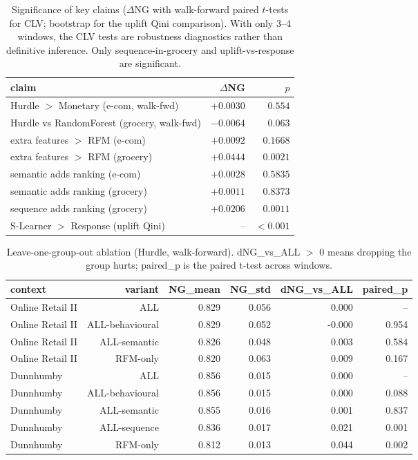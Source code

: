 \begin{table}[t]\centering
\caption{Significance of key claims ($\Delta$NG with walk-forward paired $t$-tests for CLV; bootstrap for the uplift Qini comparison). With only 3--4 windows, the CLV tests are robustness diagnostics rather than definitive inference. Only sequence-in-grocery and uplift-vs-response are significant.}\label{tab:robust}
\begin{tabular}{lrr}
\hline
claim & $\Delta$NG & $p$ \\
\hline
Hurdle $>$ Monetary (e-com, walk-fwd) & $+0.0030$ & $0.554$ \\
Hurdle vs RandomForest (grocery, walk-fwd) & $-0.0064$ & $0.063$ \\
extra features $>$ RFM (e-com) & $+0.0092$ & $0.1668$ \\
extra features $>$ RFM (grocery) & $+0.0444$ & $0.0021$ \\
semantic adds ranking (e-com) & $+0.0028$ & $0.5835$ \\
semantic adds ranking (grocery) & $+0.0011$ & $0.8373$ \\
sequence adds ranking (grocery) & $+0.0206$ & $0.0011$ \\
S-Learner $>$ Response (uplift Qini) & -- & $<0.001$ \\
\hline
\end{tabular}
\end{table}

\begin{table}[t]\centering
\caption{Leave-one-group-out ablation (Hurdle, walk-forward). dNG\_vs\_ALL $>$ 0 means dropping the group hurts; paired\_p is the paired t-test across windows.}\label{tab:ablation}
\begin{tabular}{lrrrrr}
\hline
context & variant & NG\_mean & NG\_std & dNG\_vs\_ALL & paired\_p \\
\hline
Online Retail II & ALL & 0.829 & 0.056 & 0.000 & -- \\
Online Retail II & ALL-behavioural & 0.829 & 0.052 & -0.000 & 0.954 \\
Online Retail II & ALL-semantic & 0.826 & 0.048 & 0.003 & 0.584 \\
Online Retail II & RFM-only & 0.820 & 0.063 & 0.009 & 0.167 \\
Dunnhumby & ALL & 0.856 & 0.015 & 0.000 & -- \\
Dunnhumby & ALL-behavioural & 0.856 & 0.015 & 0.000 & 0.088 \\
Dunnhumby & ALL-semantic & 0.855 & 0.016 & 0.001 & 0.837 \\
Dunnhumby & ALL-sequence & 0.836 & 0.017 & 0.021 & 0.001 \\
Dunnhumby & RFM-only & 0.812 & 0.013 & 0.044 & 0.002 \\
\hline
\end{tabular}
\end{table}

